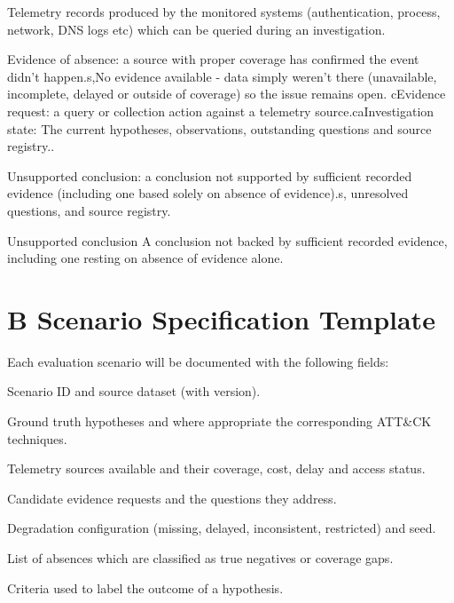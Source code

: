 \documentclass[a4paper,11pt]{article}
\begin{document}
Telemetry records produced by the monitored systems (authentication, process, network, DNS logs etc) which can be queried during an investigation.\par
Evidence of absence: a source with proper coverage has confirmed the event didn't happen.s,No evidence available - data simply weren't there (unavailable, incomplete, delayed or outside of coverage) so the issue remains open. cEvidence request: a query or collection action against a telemetry source.caInvestigation state: The current hypotheses, observations, outstanding questions and source registry..\par
Unsupported conclusion: a conclusion not supported by sufficient recorded evidence (including one based solely on absence of evidence).s, unresolved questions, and source registry.\par
Unsupported conclusion A conclusion not backed by sufficient recorded evidence, including one resting on absence of evidence alone.\par
\section*{B Scenario Specification Template}
Each evaluation scenario will be documented with the following fields:\par
Scenario ID and source dataset (with version).\par
Ground truth hypotheses and where appropriate the corresponding ATT\&CK techniques.\par
Telemetry sources available and their coverage, cost, delay and access status.\par
Candidate evidence requests and the questions they address.\par
Degradation configuration (missing, delayed, inconsistent, restricted) and seed.\par
List of absences which are classified as true negatives or coverage gaps.\par
Criteria used to label the outcome of a hypothesis.\par
\end{document}
